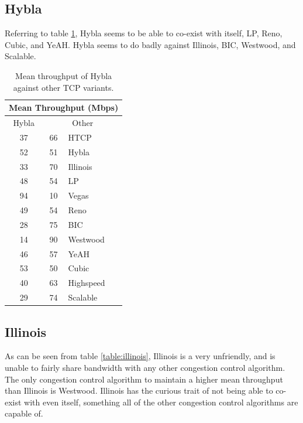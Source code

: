 \documentclass[11pt,a4paper,twocolumn]{article}
\begin{document}
\subsection{Hybla}
\label{subsec:hybla}
Referring to table \ref{table:hybla}, Hybla seems to be able to co-exist with itself, LP,
Reno, Cubic, and YeAH. Hybla seems to do badly against Illinois, BIC, Westwood, and Scalable.

\begin{table}[h!]
	\begin{center}
		\begin{tabular}{| c | c | l |}
    			\hline
			\multicolumn{3}{|c|}{Mean Throughput (Mbps)} \\
    			\hline
    			Hybla &  \multicolumn{2}{|c|}{Other}  \\
			\hline
    			37 & 66 & HTCP \\
			\hline
    			52 & 51 & Hybla \\
			\hline
    			33 & 70 & Illinois \\
			\hline
    			48 & 54 & LP \\
			\hline
    			94 & 10 & Vegas \\
			\hline
    			49 & 54 & Reno \\
			\hline
    			28 & 75 & BIC \\
			\hline
    			14 & 90 & Westwood \\
			\hline
    			46 & 57 & YeAH \\
			\hline
    			53 & 50 & Cubic \\
			\hline
    			40 & 63 & Highspeed \\
			\hline
    			29 & 74 & Scalable \\
    			\hline
    		\end{tabular}
  	\end{center}
  	\caption{Mean throughput of Hybla against other TCP variants.}
	\label{table:hybla}
\end{table}

\subsection{Illinois}
\label{subsec:illinois}
As can be seen from table \ref{table:illinois}, Illinois is a very unfriendly, and
is unable to fairly share bandwidth with any other congestion control algorithm. The only congestion control algorithm to maintain a higher mean throughput than Illinois is Westwood. Illinois has the curious trait
of not being able to co-exist with even itself, something all of the other congestion control algorithms are
capable of.
\end{document}
